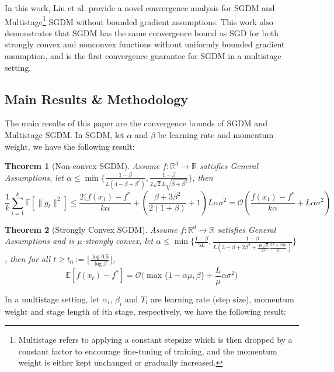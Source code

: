 \documentclass{article}
\newtheorem{theorem}{Theorem}[section]
\begin{document}
In this work, Liu et al. provide a novel convergence analysis for SGDM and
Multistage\footnote{Multistage refers to applying a constant stepsize which is then dropped by a constant factor to encourage fine-tuning of training, and the momentum weight is either kept unchanged or gradually increased.}
SGDM without bounded gradient assumptions. This work also demonstrates that SGDM has the same convergence bound as SGD for both strongly convex and nonconvex functions without uniformly bounded gradient assumption,
and is the first convergence guarantee for SGDM in a multistage setting.

\subsection{Main Results \& Methodology}
The main results of this paper are the convergence bounds of SGDM and Multistage SGDM. In SGDM, let $\alpha$ and $\beta$ be learning rate and momentum weight, we have the following result:
\begin{theorem}[Non-convex SGDM]
	\label{theom41} Assume $f:\mathbb{R}^d \rightarrow \mathbb{R}$ satisfies General Assumptions, let $\alpha \leq \min\{\frac{1 - \beta}{L(4 - \beta + \beta^2)}, \frac{1 - \beta}{2\sqrt{2}L\sqrt{\beta + \beta^2}}\}$, then
	\[
		\frac{1}{k}\sum_{i = 1}^{k}\mathbb{E}[\|g_t\|^2] \leq \frac{2 (f(x_1) - f^*}{k\alpha} + (\frac{\beta + 3\beta^2}{2 (1 + \beta)} + 1)L\alpha\sigma^2 = \mathcal{O}(\frac{f(x_1) - f^*}{k\alpha} + L\alpha\sigma^2)
	\]
\end{theorem}
\begin{theorem}[Strongly Convex SGDM]
	\label{theom42} Assume $f:\mathbb{R}^d \rightarrow \mathbb{R}$ satisfies General Assumptions and is $\mu$-strongly convex, let $\alpha \leq \min\{\frac{1 - \beta}{5L}, \frac{1 - \beta}{L(3 - \beta + 2\beta^2 + \frac{48\sqrt{\beta}}{25}\frac{2L + 18\mu}{L})}\}$, then for all $t \geq t_0:= \lfloor\frac{\log 0.5}{\log \beta}\rfloor$, 
	\[
		\mathbb{E}[f(x_t) - f^*] = \mathcal{O}\bigl(\max\{1 - \alpha\mu, \beta\} + \frac{L}{\mu}\alpha\sigma^2\bigr)
	\]
\end{theorem}
In a multistage setting, let $\alpha_i$, $\beta_i$ and $T_i$ are learning rate (step size), momentum weight and stage length of $i$th stage, respectively, we have the following result:
\end{document}
